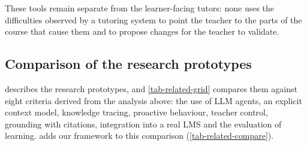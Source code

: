 These tools remain separate from the learner-facing tutors: none uses the
difficulties observed by a tutoring system to point the teacher to the
parts of the course that cause them and to propose changes for the teacher
to validate.

\subsection{Comparison of the research prototypes}
\label{subsec-comparison}

 describes the research prototypes, and
\cref{tab-related-grid} compares them against eight criteria derived from
the analysis above: the use of LLM agents, an explicit context model,
knowledge tracing, proactive behaviour, teacher control, grounding with
citations, integration into a real LMS and the evaluation of learning.
 adds our framework to this comparison
(\cref{tab-related-compare}).

